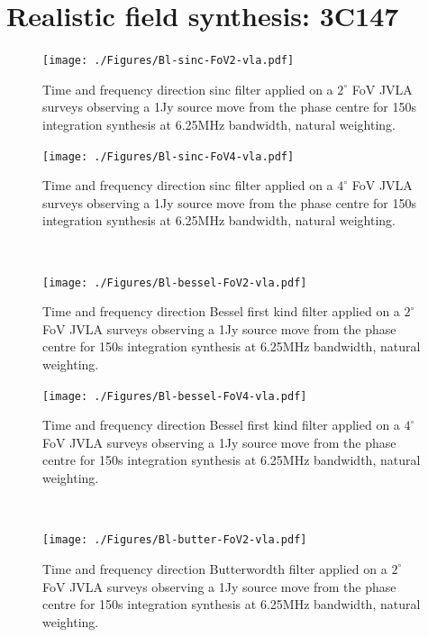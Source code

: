 \documentclass[useAMS,usenatbib]{mn2e}
\begin{document}
\section{Realistic field synthesis: 3C147}
 \begin{figure}
    \centering
  \begin{minipage}{0.38\linewidth}\texttt{[image: ./Figures/Bl-sinc-FoV2-vla.pdf]}\caption{Time and frequency 
  direction sinc filter applied on a $2^{\circ}$ FoV JVLA surveys observing a 1Jy source move from the phase centre for 150s integration 
  synthesis at 6.25MHz bandwidth, natural weighting.}\label{fig:Bl-sinc-FoV2}\end{minipage}
  \hspace{1cm}
  \begin{minipage}{0.38\linewidth}\texttt{[image: ./Figures/Bl-sinc-FoV4-vla.pdf]}\caption{Time and frequency 
  direction sinc filter applied on a $4^{\circ}$ FoV JVLA surveys observing a 1Jy source move from the phase centre for 150s integration 
  synthesis at 6.25MHz bandwidth, natural weighting.}\label{fig:Bl-sinc-FoV4} 
  \end{minipage}\\
  \begin{minipage}{0.38\linewidth}\texttt{[image: ./Figures/Bl-bessel-FoV2-vla.pdf]}\caption{Time and frequency 
  direction Bessel first kind filter applied on a $2^{\circ}$ FoV JVLA surveys observing a 1Jy source move from the phase centre for 150s 
  integration synthesis at 6.25MHz bandwidth, natural weighting.}\label{fig:Bl-bessel-FoV2}\end{minipage}
  \hspace{1cm}
  \begin{minipage}{0.38\linewidth}\texttt{[image: ./Figures/Bl-bessel-FoV4-vla.pdf]}\caption{Time and frequency 
  direction Bessel first kind filter applied on a $4^{\circ}$ FoV JVLA surveys observing a 1Jy source move from the phase centre for 150s 
  integration synthesis at 6.25MHz bandwidth, natural weighting.}\label{fig:Bl-bessel-FoV4}\end{minipage}\\
  \begin{minipage}{0.38\linewidth}\texttt{[image: ./Figures/Bl-butter-FoV2-vla.pdf]}\caption{Time and frequency 
  direction Butterwordth filter applied on a $2^{\circ}$ FoV JVLA surveys observing a 1Jy source move from the phase centre for 
  150s integration synthesis at 6.25MHz bandwidth, natural weighting.}\label{fig:Bl-butter-FoV2}\end{minipage}

\end{figure}
\end{document}
